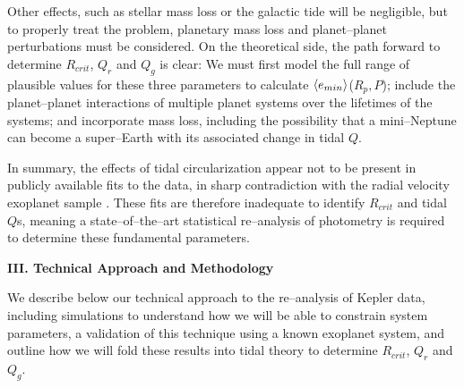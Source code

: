 Other effects, such as stellar mass loss or the galactic tide will be
negligible, but to properly treat the problem, planetary mass loss and
planet--planet perturbations must be considered.  On the theoretical
side, the path forward to determine $R_{crit}$, $Q_{r}$ and $Q_{g}$ is
clear: We must first model the full range of plausible values for
these three parameters to calculate $\left< e_{min} \right>$($R_p,P$); include
the planet--planet interactions of multiple planet systems over the
lifetimes of the systems; and incorporate mass loss, including the
possibility that a mini--Neptune can become a super--Earth with its
associated change in tidal $Q$.

In summary, the effects of tidal circularization appear not to be
present in publicly available fits to the \kepler data, in sharp
contradiction with the radial velocity exoplanet
sample \citep{Butler06}.  These fits are therefore inadequate to
identify $R_{crit}$ and tidal $Q$s, meaning a state--of--the--art
statistical re--analysis of \kepler photometry is required to
determine these fundamental parameters.

\bigskip
\centerline{\bf III. Technical Approach and Methodology}
\smallskip

%
%

We describe below our technical approach to the re--analysis of Kepler
data, including simulations to understand how we will be able to
constrain system parameters, a validation of this technique using a
known exoplanet system, and outline how we will fold these results
into tidal theory to determine $R_{crit}$, $Q_{r}$ and $Q_{g}$.

